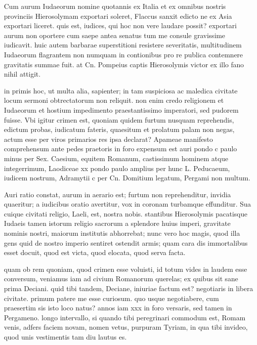  Cum aurum Iudaeorum nomine quotannis ex Italia et ex omnibus nostris provinciis Hierosolymam exportari soleret, Flaccus sanxit edicto ne ex Asia exportari liceret. quis est, iudices, qui hoc non vere laudare possit? exportari aurum non oportere cum saepe antea senatus tum me consule gravissime iudicavit. huic autem barbarae superstitioni resistere severitatis, multitudinem Iudaeorum flagrantem non numquam in contionibus pro re publica contemnere gravitatis summae fuit. at Cn. Pompeius captis Hierosolymis victor ex illo fano nihil attigit.

 in primis hoc, ut multa alia, sapienter; in tam suspiciosa ac maledica civitate locum sermoni obtrectatorum non reliquit. non enim credo religionem et Iudaeorum et hostium impedimento praestantissimo imperatori, sed pudorem fuisse. Vbi igitur crimen est, quoniam quidem furtum nusquam reprehendis, edictum probas, iudicatum fateris, quaesitum et prolatum palam non negas, actum esse per viros primarios res ipsa declarat? Apameae manifesto comprehensum ante pedes praetoris in foro expensum est auri pondo c paulo minus per Sex. Caesium, equitem Romanum, castissimum hominem atque integerrimum, Laodiceae xx pondo paulo amplius per hunc L. Peducaeum, iudicem nostrum, Adramytii c per Cn. Domitium legatum, Pergami non multum.

 Auri ratio constat, aurum in aerario est; furtum non reprehenditur, invidia quaeritur; a iudicibus oratio avertitur, vox in coronam turbamque effunditur. Sua cuique civitati religio, Laeli, est, nostra nobis. stantibus Hierosolymis pacatisque Iudaeis tamen istorum religio sacrorum a splendore huius imperi, gravitate nominis nostri, maiorum institutis abhorrebat; nunc vero hoc magis, quod illa gens quid de nostro imperio sentiret ostendit armis; quam cara dis immortalibus esset docuit, quod est victa, quod elocata, quod serva facta.

 quam ob rem quoniam, quod crimen esse voluisti, id totum vides in laudem esse conversum, veniamus iam ad civium Romanorum querelas; ex quibus sit sane prima Deciani. quid tibi tandem, Deciane, iniuriae factum est? negotiaris in libera civitate. primum patere me esse curiosum. quo usque negotiabere, cum praesertim sis isto loco natus? annos iam xxx in foro versaris, sed tamen in Pergameno. longo intervallo, si quando tibi peregrinari commodum est, Romam venis, adfers faciem novam, nomen vetus, purpuram Tyriam, in qua tibi invideo, quod unis vestimentis tam diu lautus es.

